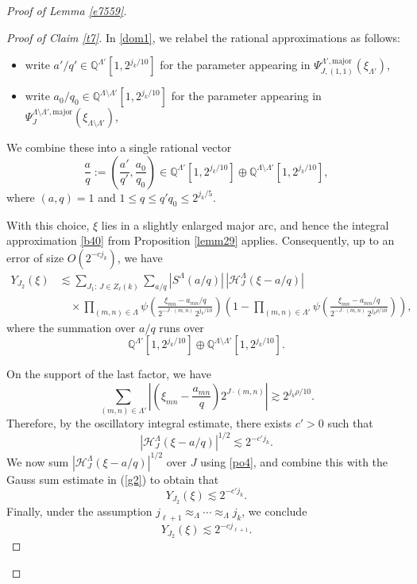 \documentclass[10pt,a4paper]{amsart}
\numberwithin{equation}{section}
\begin{document}
\begin{proof}[Proof of Lemma \ref{e7559}]
 
\begin{proof}[Proof of Claim \ref{t7}]
In \eqref{dom1}, we relabel the rational approximations as follows:
\begin{itemize}
\item write $a'/q' \in \mathbb{Q}^{\Lambda'}[1,2^{j_k/10}]$ 
for the parameter appearing in 
$\Psi_{J,(1,1)}^{\Lambda',\mathrm{major}}(\xi_{\Lambda'})$,
\item write $a_0/q_0 \in \mathbb{Q}^{\Lambda\setminus\Lambda'}[1,2^{j_k/10}]$ 
for the parameter appearing in 
$\Psi_J^{\Lambda\setminus\Lambda',\mathrm{major}}(\xi_{\Lambda\setminus\Lambda'})$,
\end{itemize}
We combine these into a single rational vector
\[
\frac{a}{q}
:= \left(\frac{a'}{q'},\frac{a_0}{q_0}\right)
\in 
\mathbb{Q}^{\Lambda'}[1,2^{j_k/10}]\oplus\mathbb{Q}^{\Lambda\setminus\Lambda'}[1,2^{j_k/10}],
\]
where $(a,q)=1$ and $1\le q\le q'q_0\le 2^{j_k/5}$.

With this choice, $\xi$ lies in a slightly enlarged major arc, and hence
the integral approximation \eqref{b40} from Proposition \ref{lemm29}
applies. Consequently, up to an error of size $O(2^{-c j_k})$, we have
\begin{align*}
Y_{J_2}(\xi)
&\lesssim 
\sum_{J_1:\,J\in Z_\ell(k)}
\sum_{a/q}
|S^{\Lambda}(a/q)|
\,|\mathcal{H}^{\Lambda}_J(\xi-a/q)| \\
&\quad\times
\prod_{(m,n)\in \Lambda}
\psi\!\left(
\frac{\xi_{mn}-a_{mn}/q}{2^{-J\cdot(m,n)}\,2^{j_k/10}}
\right)
\left(1-
\prod_{(m,n)\in \Lambda'}
\psi\!\left(
\frac{\xi_{mn}-a_{mn}/q}{2^{-J\cdot(m,n)}\,2^{j_k\rho/10}}
\right)
\right),
\end{align*}
where the summation over $a/q$ runs over
\[
\mathbb{Q}^{\Lambda'}[1,2^{j_k/10}]\oplus\mathbb{Q}^{\Lambda\setminus\Lambda'}[1,2^{j_k/10}].
\]

On the support of the last factor, we have
\[
\sum_{(m,n)\in \Lambda'}
\left|
\left(\xi_{mn}-\frac{a_{mn}}{q}\right)
2^{J\cdot(m,n)}
\right|
\gtrsim 2^{j_k\rho/10}.
\]
Therefore, by the    oscillatory integral estimate, there exists $c'>0$ such that
\[
|\mathcal{H}^{\Lambda}_J(\xi-a/q)|^{1/2}
\lesssim 2^{-c'j_k}.
\]
We now sum   $|\mathcal{H}^{\Lambda}_J(\xi-a/q)|^{1/2}$ over $J$ using \eqref{po4}, and combine this with the Gauss sum estimate in (\ref{g2}) to obtain that
\[
Y_{J_2}(\xi)\lesssim 2^{-c' j_k}.
\]
Finally, under the assumption $j_{\ell+1}\approx_{\Lambda}\cdots\approx_{\Lambda} j_k$,
we conclude
\[
Y_{J_2}(\xi)\lesssim 2^{-c j_{\ell+1}}.
\]
\end{proof}


\end{proof}
\end{document}

